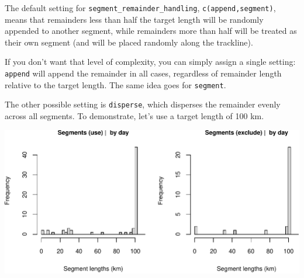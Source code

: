\documentclass[
]{book}
\newenvironment{Shaded}{\begin{snugshade}}{\end{snugshade}}
\newcommand{\CommentTok}[1]{\textcolor[rgb]{0.56,0.35,0.01}{\textit{#1}}}
\newcommand{\DataTypeTok}[1]{\textcolor[rgb]{0.13,0.29,0.53}{#1}}
\newcommand{\DecValTok}[1]{\textcolor[rgb]{0.00,0.00,0.81}{#1}}
\newcommand{\KeywordTok}[1]{\textcolor[rgb]{0.13,0.29,0.53}{\textbf{#1}}}
\newcommand{\NormalTok}[1]{#1}
\newcommand{\OperatorTok}[1]{\textcolor[rgb]{0.81,0.36,0.00}{\textbf{#1}}}
\newcommand{\OtherTok}[1]{\textcolor[rgb]{0.56,0.35,0.01}{#1}}
\newcommand{\StringTok}[1]{\textcolor[rgb]{0.31,0.60,0.02}{#1}}
\begin{document}
The default setting for \texttt{segment\_remainder\_handling}, \texttt{c(\textquotesingle{}append\textquotesingle{},\textquotesingle{}segment\textquotesingle{})}, means that remainders less than half the target length will be randomly appended to another segment, while remainders more than half will be treated as their own segment (and will be placed randomly along the trackline).

If you don't want that level of complexity, you can simply assign a single setting: \texttt{\textquotesingle{}append\textquotesingle{}} will append the remainder in all cases, regardless of remainder length relative to the target length. The same idea goes for \texttt{\textquotesingle{}segment\textquotesingle{}}.

The other possible setting is \texttt{\textquotesingle{}disperse\textquotesingle{}}, which disperses the remainder evenly across all segments. To demonstrate, let's use a target length of 100 km.

\begin{Shaded}
\end{Shaded}

\includegraphics{figures/unnamed-chunk-273-1.pdf}
\end{document}
